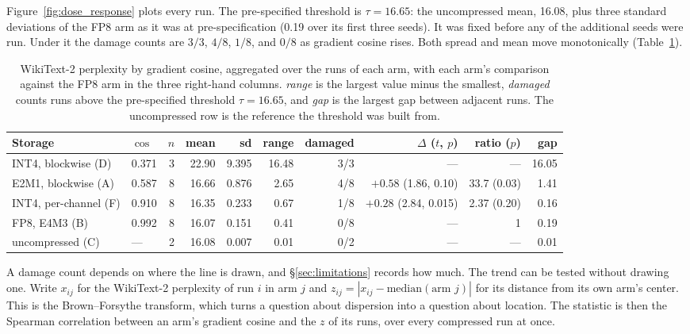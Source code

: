 \documentclass[11pt,letterpaper]{article}
\begin{document}
Figure~\ref{fig:dose_response} plots every run. The pre-specified threshold is $\tau = 16.65$: the uncompressed mean, 16.08, plus three standard deviations of the FP8 arm as it was at pre-specification (0.19 over its first three seeds). It was fixed before any of the additional seeds were run. Under it the damage counts are $3/3$, $4/8$, $1/8$, and $0/8$ as gradient cosine rises. Both spread and mean move monotonically (Table~\ref{tab:dose_summary}).

\begin{table}[htbp]
\centering
\small
\caption{WikiText-2 perplexity by gradient cosine, aggregated over the runs of each arm, with each arm's comparison against the FP8 arm in the three right-hand columns. \emph{range} is the largest value minus the smallest, \emph{damaged} counts runs above the pre-specified threshold $\tau = 16.65$, and \emph{gap} is the largest gap between adjacent runs. The uncompressed row is the reference the threshold was built from.}
\label{tab:dose_summary}
\setlength{\tabcolsep}{3pt}
\begin{tabular}{llrrrrrrrr}
\toprule
Storage & $\cos$ & $n$ & mean & sd & range & damaged & $\Delta$ ($t$, $p$) & ratio ($p$) & gap \\
\midrule
INT4, blockwise (D)     & 0.371 & 3 & 22.90 & 9.395 & 16.48 & 3/3 & ---                   & ---          & 16.05 \\
E2M1, blockwise (A)     & 0.587 & 8 & 16.66 & 0.876 & 2.65  & 4/8 & $+0.58$ (1.86, 0.10)  & 33.7 (0.03)  & 1.41 \\
INT4, per-channel (F)   & 0.910 & 8 & 16.35 & 0.233 & 0.67  & 1/8 & $+0.28$ (2.84, 0.015) & 2.37 (0.20)  & 0.16 \\
FP8, E4M3 (B)           & 0.992 & 8 & 16.07 & 0.151 & 0.41  & 0/8 & ---                   & 1            & 0.19 \\
\midrule
uncompressed (C) & --- & 2 & 16.08 & 0.007 & 0.01 & 0/2 & --- & --- & 0.01 \\
\bottomrule
\end{tabular}
\end{table}

\medskip
A damage count depends on where the line is drawn, and \S\ref{sec:limitations} records how much. The trend can be tested without drawing one. Write $x_{ij}$ for the WikiText-2 perplexity of run $i$ in arm $j$ and $z_{ij} = |x_{ij} - \mathrm{median}(\text{arm } j)|$ for its distance from its own arm's center. This is the Brown--Forsythe transform, which turns a question about dispersion into a question about location. The statistic is then the Spearman correlation between an arm's gradient cosine and the $z$ of its runs, over every compressed run at once.
\end{document}
